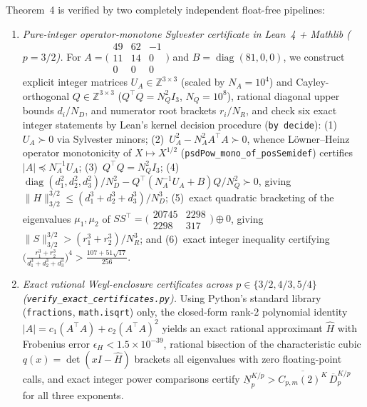 \documentclass[10pt,letterpaper]{article}
\newcommand{\diag}{\operatorname{diag}}
\begin{document}
Theorem~4 is verified by two completely independent float-free pipelines:
\begin{enumerate}[leftmargin=1.6em,itemsep=2pt]
  \item \emph{Pure-integer operator-monotone Sylvester certificate in Lean~4 + Mathlib ($p = 3/2$).} For $A = \bigl(\begin{smallmatrix} 49 & 62 & -1 \\ 11 & 14 & 0 \\ 0 & 0 & 0 \end{smallmatrix}\bigr)$ and $B = \diag(81,0,0)$, we construct explicit integer matrices $U_A \in \mathbb{Z}^{3\times 3}$ (scaled by $N_A = 10^4$) and Cayley-orthogonal $Q \in \mathbb{Z}^{3\times 3}$ ($Q^\top Q = N_Q^2 I_3$, $N_Q = 10^8$), rational diagonal upper bounds $d_i/N_D$, and numerator root brackets $r_i/N_R$, and check six exact integer statements by Lean's kernel decision procedure (\texttt{by decide}): (1)~$U_A \succ 0$ via Sylvester minors; (2)~$U_A^2 - N_A^2 A^\top A \succ 0$, whence L\"owner--Heinz operator monotonicity of $X \mapsto X^{1/2}$ (\texttt{psdPow\_mono\_of\_posSemidef}) certifies $|A| \preceq N_A^{-1} U_A$; (3)~$Q^\top Q = N_Q^2 I_3$; (4)~$\diag(d_1^2, d_2^2, d_3^2)/N_D^2 - Q^\top(N_A^{-1}U_A + B)Q/N_Q^2 \succ 0$, giving $\|H\|_{3/2}^{3/2} \le (d_1^3+d_2^3+d_3^3)/N_D^3$; (5)~exact quadratic bracketing of the eigenvalues $\mu_1, \mu_2$ of $SS^\top = \bigl(\begin{smallmatrix} 20745 & 2298 \\ 2298 & 317 \end{smallmatrix}\bigr) \oplus 0$, giving $\|S\|_{3/2}^{3/2} > (r_1^3+r_2^3)/N_R^3$; and (6)~exact integer inequality certifying $\bigl(\frac{r_1^3+r_2^3}{d_1^3+d_2^3+d_3^3}\bigr)^4 > \frac{107+51\sqrt{17}}{256}$.
  \item \emph{Exact rational Weyl-enclosure certificates across $p \in \{3/2, 4/3, 5/4\}$ (\texttt{verify\_exact\_certificates.py}).} Using Python's standard library (\texttt{fractions}, \texttt{math.isqrt}) only, the closed-form rank-2 polynomial identity $|A| = c_1(A^\top A) + c_2(A^\top A)^2$ yields an exact rational approximant $\widehat{H}$ with Frobenius error $\epsilon_H < 1.5\times 10^{-39}$, rational bisection of the characteristic cubic $q(x) = \det(xI - \widehat{H})$ brackets all eigenvalues with zero floating-point calls, and exact integer power comparisons certify $\underline{N}_p^{K/p} > \overline{C_{p,m}(2)^K}\,\overline{D}_p^{K/p}$ for all three exponents.
\end{enumerate}
\end{document}
